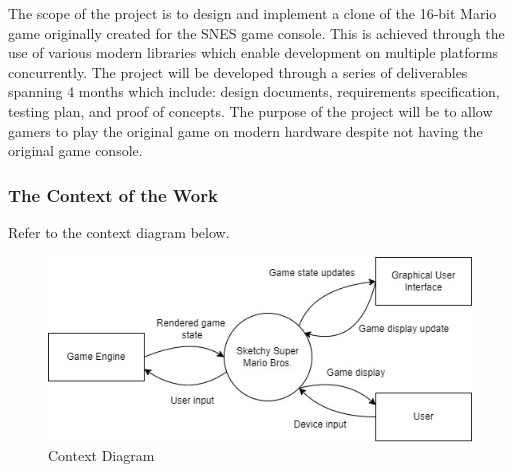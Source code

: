 \documentclass[12pt, titlepage]{article}
\begin{document}
The scope of the project is to design and implement a clone of the 16-bit Mario game originally created for the SNES game console. This is achieved through the use of various modern libraries which enable development on multiple platforms concurrently. The project will be developed through a series of deliverables spanning 4 months which include: design documents, requirements specification, testing plan, and proof of concepts. The purpose of the project will be to allow gamers to play the original game on modern hardware despite not having the original game console.

\subsubsection{The Context of the Work}

Refer to the context diagram below.

\begin{figure}[h]
\centering
\includegraphics[scale=0.7]{images/contextdiagram.jpeg}
\caption{Context Diagram}
\end{figure}
\end{document}

